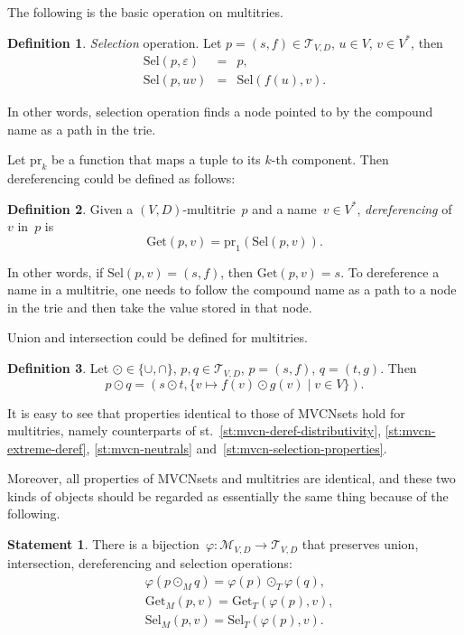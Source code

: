 \documentclass{article}
\theoremstyle{definition}
\newtheorem{Df}{Definition}
\newtheorem{St}{Statement}
\newcommand{\setcharmvcn}{M}
\newcommand{\setcharmt}{T}
\newcommand{\setsymbol}[3]{\mathcal{#1}_{#2,#3}}
\newcommand{\setmvcn}[2]{\setsymbol{\setcharmvcn}{#1}{#2}}
\newcommand{\setmt}[2]{\setsymbol{\setcharmt}{#1}{#2}}
\newcommand{\select}{\mathrm{Sel}}
\newcommand{\proj}[1]{\mathrm{pr}_{#1}}
\newcommand{\derefsymbol}{\mathrm{Get}}
\newcommand{\deref}[2]{\derefsymbol(#1, #2)}
\begin{document}
The following is the basic operation on multitries.
\begin{Df}\label{df:mt-select}
\emph{Selection} operation. Let $p=(s,f) \in \setmt{V}{D}$, $u\in V$,
$v\in V^\ast$, then
\begin{eqnarray*}
  \select(p, \varepsilon) & = & p , \\
  \select(p, u v) & = & \select(f(u), v) .
\end{eqnarray*}
\end{Df}

In other words, selection operation finds a node pointed to by the
compound name as a path in the trie.

Let $\proj{k}$ be a function that maps a tuple to its $k$-th component.
Then dereferencing could be defined as follows:
\begin{Df}\label{df:mt-deref}
Given a $(V,D)$-multitrie~$p$ and a name~$v\in V^\ast$, \emph{dereferencing}
of~$v$ in~$p$ is
\[
  \deref{p}{v} = \proj{1}(\select(p, v)) .
\]
\end{Df}

In other words, if $\select(p,v) = (s,f)$, then $\deref{p}{v} = s$. To
dereference a name in a multitrie, one needs to follow the compound name
as a path to a node in the trie and then take the value stored in that node.

Union and intersection could be defined for multitries.
\begin{Df}\label{df:mt-setop}
Let $\odot \in \{ \cup, \cap \}$, $p, q \in \setmt{V}{D}$,
$p = (s,f)$, $q = (t, g)$. Then
\[
  p \odot q = (s \odot t, \{ v \mapsto f(v) \odot g(v) \mid v \in V \}) .
\]
\end{Df}

It is easy to see that properties identical to those of MVCNsets
hold for multitries, namely counterparts of
st.~\ref{st:mvcn-deref-distributivity},
\ref{st:mvcn-extreme-deref},
\ref{st:mvcn-neutrals}
and~\ref{st:mvcn-selection-properties}.

Moreover, all properties of MVCNsets and multitries are identical, and these
two kinds of objects should be regarded as essentially the same thing because
of the following.

\begin{St}\label{st:isomorph}
There is a bijection~$\varphi: \setmvcn{V}{D} \to \setmt{V}{D}$ that preserves
union, intersection, dereferencing and selection operations:
\begin{eqnarray*}
  & \varphi(p \mathbin{\odot_{\setcharmvcn}} q) =
      \varphi(p) \mathbin{\odot_{\setcharmt}} \varphi(q) , \\
  & \derefsymbol_{\setcharmvcn}(p, v) =
      \derefsymbol_{\setcharmt}(\varphi(p), v) , \\
  & \select_{\setcharmvcn}(p, v) =
      \select_{\setcharmt}(\varphi(p), v) .
\end{eqnarray*}
\end{St}
\end{document}
